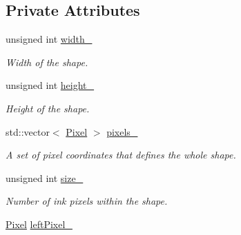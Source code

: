\subsection*{Private Attributes}
\begin{CompactItemize}
\item 
\hypertarget{class_shape_863661d529942b525830d2208259583b}{
unsigned int \hyperlink{class_shape_863661d529942b525830d2208259583b}{width\_\-}}
\label{class_shape_863661d529942b525830d2208259583b}

\begin{CompactList}\small\item\em Width of the shape. \item\end{CompactList}\item 
\hypertarget{class_shape_76354eeb3b4c5c6c9125f4195c3c274c}{
unsigned int \hyperlink{class_shape_76354eeb3b4c5c6c9125f4195c3c274c}{height\_\-}}
\label{class_shape_76354eeb3b4c5c6c9125f4195c3c274c}

\begin{CompactList}\small\item\em Height of the shape. \item\end{CompactList}\item 
\hypertarget{class_shape_286ebb0c6010efe288d5e79192e309dc}{
std::vector$<$ \hyperlink{_pixel_8hpp_535e59456e3e633842529cfa8ea103c4}{Pixel} $>$ \hyperlink{class_shape_286ebb0c6010efe288d5e79192e309dc}{pixels\_\-}}
\label{class_shape_286ebb0c6010efe288d5e79192e309dc}

\begin{CompactList}\small\item\em A set of pixel coordinates that defines the whole shape. \item\end{CompactList}\item 
\hypertarget{class_shape_adec7080fb17de89d2f6c9d53d4b0283}{
unsigned int \hyperlink{class_shape_adec7080fb17de89d2f6c9d53d4b0283}{size\_\-}}
\label{class_shape_adec7080fb17de89d2f6c9d53d4b0283}

\begin{CompactList}\small\item\em Number of ink pixels within the shape. \item\end{CompactList}\item 
\hypertarget{class_shape_812cd080959b320038aae54729831ce4}{
\hyperlink{_pixel_8hpp_535e59456e3e633842529cfa8ea103c4}{Pixel} \hyperlink{class_shape_812cd080959b320038aae54729831ce4}{leftPixel\_\-}}
\label{class_shape_812cd080959b320038aae54729831ce4}


\end{CompactItemize}
